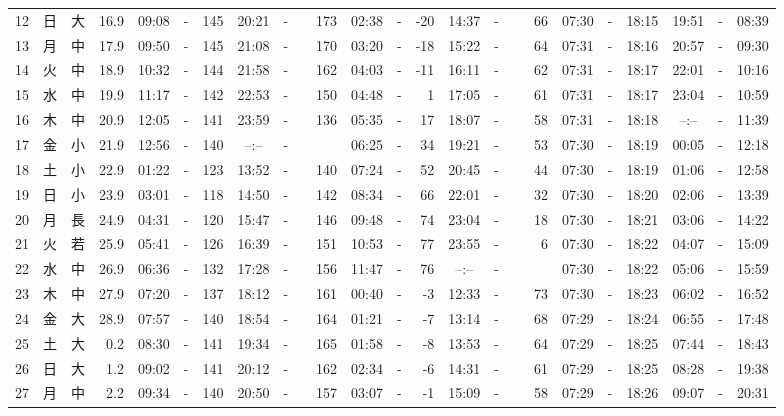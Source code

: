 \documentclass[12pt,a4j]{jsarticle}
\begin{document}
\begin{table}[htbp]
\begin{center}
{\begin{tabular}{|rc|cr|ccrccr|ccrccr|ccc|ccc|}
12 & 日 & 大 & 16.9 &  09:08 &-& 145 &  20:21 &-& 173 &  02:38 &-& -20 &  14:37 &-&  66 & 07:30 & -& 18:15 & 19:51 & -& 08:39 \\
13 & 月 & 中 & 17.9 &  09:50 &-& 145 &  21:08 &-& 170 &  03:20 &-& -18 &  15:22 &-&  64 & 07:31 & -& 18:16 & 20:57 & -& 09:30 \\
14 & 火 & 中 & 18.9 &  10:32 &-& 144 &  21:58 &-& 162 &  04:03 &-& -11 &  16:11 &-&  62 & 07:31 & -& 18:17 & 22:01 & -& 10:16 \\
15 & 水 & 中 & 19.9 &  11:17 &-& 142 &  22:53 &-& 150 &  04:48 &-&   1 &  17:05 &-&  61 & 07:31 & -& 18:17 & 23:04 & -& 10:59 \\
16 & 木 & 中 & 20.9 &  12:05 &-& 141 &  23:59 &-& 136 &  05:35 &-&  17 &  18:07 &-&  58 & 07:31 & -& 18:18 & --:-- & -& 11:39 \\
17 & 金 & 小 & 21.9 &  12:56 &-& 140 &  --:-- &-&~~~~~ &  06:25 &-&  34 &  19:21 &-&  53 & 07:30 & -& 18:19 & 00:05 & -& 12:18 \\
18 & 土 & 小 & 22.9 &  01:22 &-& 123 &  13:52 &-& 140 &  07:24 &-&  52 &  20:45 &-&  44 & 07:30 & -& 18:19 & 01:06 & -& 12:58 \\
19 & 日 & 小 & 23.9 &  03:01 &-& 118 &  14:50 &-& 142 &  08:34 &-&  66 &  22:01 &-&  32 & 07:30 & -& 18:20 & 02:06 & -& 13:39 \\
20 & 月 & 長 & 24.9 &  04:31 &-& 120 &  15:47 &-& 146 &  09:48 &-&  74 &  23:04 &-&  18 & 07:30 & -& 18:21 & 03:06 & -& 14:22 \\
21 & 火 & 若 & 25.9 &  05:41 &-& 126 &  16:39 &-& 151 &  10:53 &-&  77 &  23:55 &-&   6 & 07:30 & -& 18:22 & 04:07 & -& 15:09 \\
22 & 水 & 中 & 26.9 &  06:36 &-& 132 &  17:28 &-& 156 &  11:47 &-&  76 &  --:-- &-&~~~~~ & 07:30 & -& 18:22 & 05:06 & -& 15:59 \\
23 & 木 & 中 & 27.9 &  07:20 &-& 137 &  18:12 &-& 161 &  00:40 &-&  -3 &  12:33 &-&  73 & 07:30 & -& 18:23 & 06:02 & -& 16:52 \\
24 & 金 & 大 & 28.9 &  07:57 &-& 140 &  18:54 &-& 164 &  01:21 &-&  -7 &  13:14 &-&  68 & 07:29 & -& 18:24 & 06:55 & -& 17:48 \\
25 & 土 & 大 &  0.2 &  08:30 &-& 141 &  19:34 &-& 165 &  01:58 &-&  -8 &  13:53 &-&  64 & 07:29 & -& 18:25 & 07:44 & -& 18:43 \\
26 & 日 & 大 &  1.2 &  09:02 &-& 141 &  20:12 &-& 162 &  02:34 &-&  -6 &  14:31 &-&  61 & 07:29 & -& 18:25 & 08:28 & -& 19:38 \\
27 & 月 & 中 &  2.2 &  09:34 &-& 140 &  20:50 &-& 157 &  03:07 &-&  -1 &  15:09 &-&  58 & 07:29 & -& 18:26 & 09:07 & -& 20:31 \\

\end{tabular}}
\end{center}
\end{table}
\end{document}
